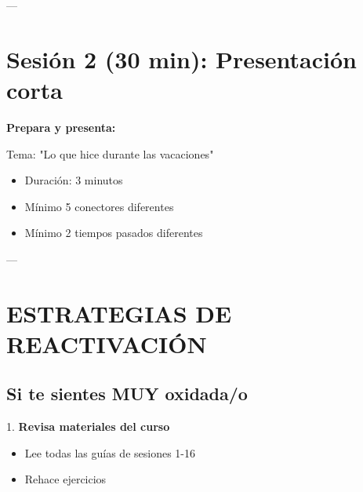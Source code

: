 \documentclass[a4paper,11pt]{article}
\begin{document}
\vspace{0.2cm}

---

\vspace{0.2cm}

\section{Sesión 2 (30 min): Presentación corta}

\vspace{0.2cm}

\textbf{Prepara y presenta:}

Tema: "Lo que hice durante las vacaciones"

\begin{itemize}

  \item Duración: 3 minutos

  \item Mínimo 5 conectores diferentes

  \item Mínimo 2 tiempos pasados diferentes

\end{itemize}

\vspace{0.2cm}

---

\vspace{0.2cm}

\section{ESTRATEGIAS DE REACTIVACIÓN}

\vspace{0.2cm}

\subsection{Si te sientes MUY oxidada/o}

\vspace{0.2cm}

1. \textbf{Revisa materiales del curso}

\begin{itemize}

  \item Lee todas las guías de sesiones 1-16

  \item Rehace ejercicios

\end{itemize}
\end{document}
